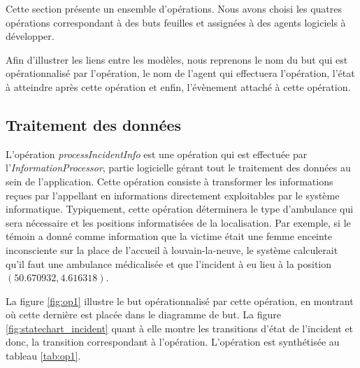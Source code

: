 Cette section présente un ensemble d'opérations. Nous avons choisi les quatres
opérations correspondant à des buts feuilles et assignées à des agents logiciels
à développer.

Afin d'illustrer les liens entre les modèles, nous reprenons le nom du but
qui est opérationnalisé par l'opération, le nom de l'agent qui effectuera 
l'opération, l'état à atteindre après cette opération et enfin, l'évènement
attaché à cette opération.

\subsection{Traitement des données}

	L'opération \textit{processIncidentInfo} est une opération qui est effectuée par l'\textit{InformationProcessor},
	partie logicielle gérant tout le traitement des données au sein de
	l'application. Cette opération consiste à transformer les informations
	reçues par l'appellant en informations directement exploitables par le
	système informatique. Typiquement, cette opération déterminera 
	le type d'ambulance qui sera nécessaire et les positions \og informatisées \fg
	de la localisation. Par exemple, si le témoin a donné comme information
	que la victime était une femme enceinte inconsciente sur la place de l'accueil
	à louvain-la-neuve, le système calculerait qu'il faut une ambulance
	médicalisée et que l'incident à eu lieu à la position $(50.670932,4.616318)$.
	
	La figure \ref{fig:op1} illustre le but opérationnalisé par cette opération,
	en montrant où cette dernière est placée dans le diagramme de but. La figure
	\ref{fig:statechart_incident} quant à elle montre les transitions d'état 
	de l'incident et donc, la transition correspondant à l'opération. 
	L'opération est synthétisée au tableau \ref{tab:op1}.
	
	\vfill
	\vfill
	
